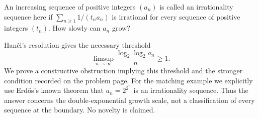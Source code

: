 An increasing sequence of positive integers $(a_n)$ is called an irrationality sequence here if $\sum_{n\ge1}1/(t_na_n)$ is irrational for every sequence of positive integers $(t_n)$. How slowly can $a_n$ grow?

Han\v cl's resolution gives the necessary threshold
\[
 \limsup_{n\to\infty}\frac{\log_2\log_2 a_n}{n}\ge1.
 \tag{1}
\]
We prove a constructive obstruction implying this threshold and the stronger condition recorded on the problem page. For the matching example we explicitly use Erd\H{o}s's known theorem that $a_n=2^{2^n}$ is an irrationality sequence. Thus the answer concerns the double-exponential growth scale, not a classification of every sequence at the boundary. No novelty is claimed.
